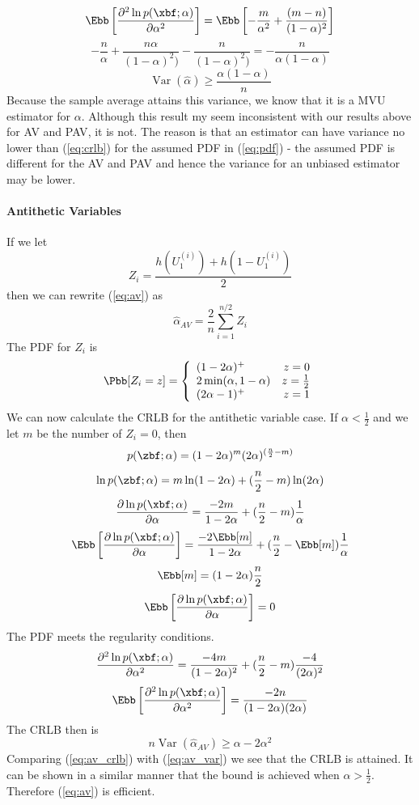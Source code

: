 \documentclass[10pt]{article}
\DeclareMathOperator{\var}{Var}
\begin{document}
\[
\Ebb\left[\frac{\partial^2\ln p(\xbf;\alpha)}{\partial\alpha^2}\right] = \Ebb\left[-\frac{m}{\alpha^2} + \frac{(m-n)}{(1-\alpha)^2}\right]
\]
\[
-\frac{n}{\alpha}+\frac{n\alpha}{(1-\alpha)^2)}-\frac{n}{(1-\alpha)^2)}=-\frac{n}{\alpha(1-\alpha)}
\]
\begin{equation}
\var\left(\hat{\alpha}\right) \geq \frac{\alpha(1-\alpha)}{n}\label{eq:crlb}
\end{equation}
Because the sample average attains this variance, we know that it is a \ac{MVU} estimator for $\alpha$. Although this result my seem inconsistent with our results above for \ac{AV} and \ac{PAV}, it is not. The reason is that an estimator can have variance no lower than (\ref{eq:crlb}) for the assumed \ac{PDF} in (\ref{eq:pdf}) - the assumed \ac{PDF} is different for the \ac{AV} and \ac{PAV} and hence the variance for an unbiased estimator may be lower.

\paragraph{Antithetic Variables}
If we let
\[ Z_i = \frac{h(U_{1}^{(i)})+h(1 - U_{1}^{(i)})}{2}\]
then we can rewrite (\ref{eq:av}) as
\begin{equation*}
\hat{\alpha}_{AV} = \frac{2}{n}\displaystyle\sum_{i=1}^{n/2}Z_i
\end{equation*}
The \ac{PDF} for $Z_i$ is
\begin{equation}
\Pbb[Z_i = z] = \left\{
\begin{array}{lr}
(1-2\alpha)^{+} & z = 0\\
2\min(\alpha, 1-\alpha) & z = \frac{1}{2}\\
(2\alpha - 1)^{+} & z = 1
\end{array}\right.
\end{equation}
We can now calculate the \ac{CRLB} for the antithetic variable case. If $\alpha < \frac{1}{2}$ and we let $m$ be the number of $Z_i=0$, then
\[p(\zbf;\alpha) = (1-2\alpha)^m(2\alpha)^{(\frac{n}{2}-m)}\]
\[\ln p(\zbf;\alpha) = m\ln(1-2\alpha) + (\frac{n}{2}-m)\ln(2\alpha)\]
\[\frac{\partial \ln p(\xbf;\alpha)}{\partial\alpha} = \frac{-2m}{1-2\alpha} + (\frac{n}{2}-m)\frac{1}{\alpha}\]
\[\Ebb\left[\frac{\partial \ln p(\xbf;\alpha)}{\partial\alpha}\right] = \frac{-2\Ebb[m]}{1-2\alpha} + (\frac{n}{2}-\Ebb[m])\frac{1}{\alpha}\]
\[\Ebb[m] = (1-2\alpha)\frac{n}{2}\]
\[\Ebb\left[\frac{\partial \ln p(\xbf;\alpha)}{\partial\alpha}\right] = 0 \]
The \ac{PDF} meets the regularity conditions.
\[\frac{\partial^2 \ln p(\xbf;\alpha)}{\partial\alpha^2} = \frac{-4m}{(1-2\alpha)^2} + (\frac{n}{2}-m)\frac{-4}{(2\alpha)^2}\]
\[\Ebb\left[\frac{\partial^2 \ln p(\xbf;\alpha)}{\partial\alpha^2}\right] = \frac{-2n}{(1-2\alpha)(2\alpha)}\]
The \ac{CRLB} then is
\begin{equation}
n\var\left(\hat{\alpha}_{AV}\right) \geq \alpha -2\alpha^2\label{eq:av_crlb}
\end{equation}
Comparing (\ref{eq:av_crlb}) with (\ref{eq:av_var}) we see that the \ac{CRLB} is attained. It can be shown in a similar manner that the bound is achieved when $\alpha > \frac{1}{2}$. Therefore (\ref{eq:av}) is efficient.
\end{document}
